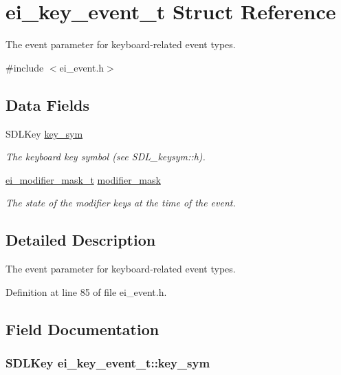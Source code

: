 \hypertarget{structei__key__event__t}{
\section{ei\_\-key\_\-event\_\-t Struct Reference}
\label{structei__key__event__t}
}


The event parameter for keyboard-\/related event types.  


{\ttfamily \#include $<$ei\_\-event.h$>$}\subsection*{Data Fields}
\begin{DoxyCompactItemize}
\item 
SDLKey \hyperlink{structei__key__event__t_a34be444e0f81bfa20e0b053779faf873}{key\_\-sym}
\begin{DoxyCompactList}\small\item\em The keyboard key symbol (see SDL\_\-keysym::h). \item\end{DoxyCompactList}\item 
\hyperlink{ei__event_8h_abcdd2ef0f39179463f17a06be9bdf949}{ei\_\-modifier\_\-mask\_\-t} \hyperlink{structei__key__event__t_a35e4dc6d788b9fdd4eeedf716662afab}{modifier\_\-mask}
\begin{DoxyCompactList}\small\item\em The state of the modifier keys at the time of the event. \item\end{DoxyCompactList}\end{DoxyCompactItemize}


\subsection{Detailed Description}
The event parameter for keyboard-\/related event types. 

Definition at line 85 of file ei\_\-event.h.

\subsection{Field Documentation}
\hypertarget{structei__key__event__t_a34be444e0f81bfa20e0b053779faf873}{
\subsubsection[{key\_\-sym}]{\setlength{\rightskip}{0pt plus 5cm}SDLKey {\bf ei\_\-key\_\-event\_\-t::key\_\-sym}}}
\label{structei__key__event__t_a34be444e0f81bfa20e0b053779faf873}


